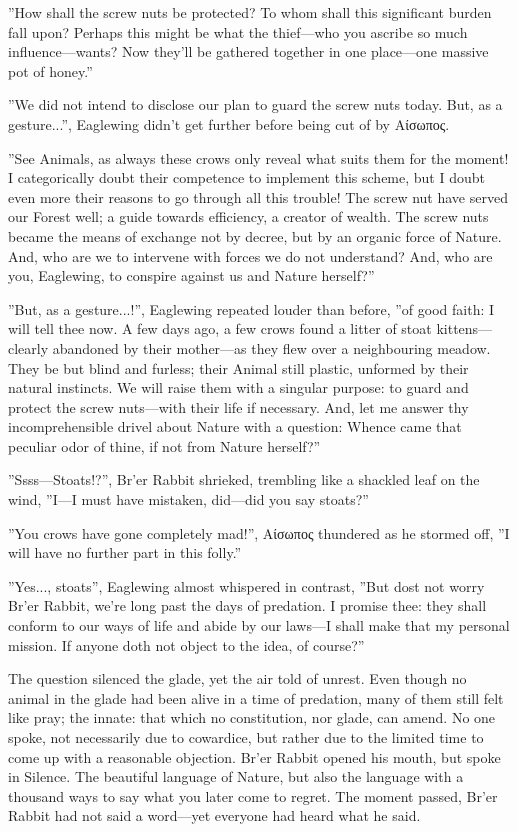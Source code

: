 ”How shall the screw nuts be protected? To whom shall this significant burden fall upon? Perhaps this might be what the thief---who you ascribe so much influence---wants? Now they'll be gathered together in one place—one massive pot of honey.”

”We did not intend to disclose our plan to guard the screw nuts today. But, as a gesture...”, Eaglewing didn't get further before being cut of by Αίσωπος. 

”See Animals, as always these crows only reveal what suits them for the moment! I categorically doubt their competence to implement this scheme, but I doubt even more their reasons to go through all this trouble! The screw nut have served our Forest well; a guide towards efficiency, a creator of wealth. The screw nuts became the means of exchange not by decree, but by an organic force of Nature. And, who are we to intervene with forces we do not understand? And, who are you, Eaglewing, to conspire against us and Nature herself?”

”But, as a gesture...!”, Eaglewing repeated louder than before, ”of good faith: I will tell thee now. A few days ago, a few crows found a litter of stoat kittens—clearly abandoned by their mother—as they flew over a neighbouring meadow. They be but blind and furless; their Animal still plastic, unformed by their natural instincts. We will raise them with a singular purpose: to guard and protect the screw nuts---with
their life if necessary. And, let me answer thy incomprehensible drivel about Nature with a question: Whence came that peculiar odor of thine, if not from Nature herself?”

”Ssss---Stoats!?”, Br'er Rabbit shrieked, trembling like a shackled leaf on the wind, ”I---I must have mistaken, did---did you say stoats?”

”You crows have gone completely mad!”, Αίσωπος thundered as he stormed off, ”I will have no further part in this folly.”

”Yes..., stoats”, Eaglewing almost whispered in contrast, ”But dost not worry Br'er Rabbit, we're long past the days of predation. I promise thee: they shall conform to our ways of life and abide by our laws—I shall make that my personal mission. If anyone doth not object to the idea, of course?”

The question silenced the glade, yet the air told of unrest. Even though no animal in the glade had been alive in a time of predation, many of them still felt like pray; the innate: that which no constitution, nor glade, can amend. No one spoke, not necessarily due to cowardice, but rather due to the limited time to come up with a reasonable objection. Br'er Rabbit opened his mouth, but spoke in Silence. The beautiful language of Nature, but also the language with a
thousand ways to say what you later come to regret. The moment passed, Br'er Rabbit had not said a word---yet everyone had heard what he said.

